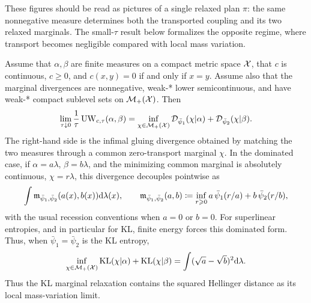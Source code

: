 These figures should be read as pictures of a single relaxed plan $\pi$: the same nonnegative measure determines both the transported coupling and its two relaxed marginals. The small-$\tau$ result below formalizes the opposite regime, where transport becomes negligible compared with local mass variation.

\begin{prop}\label{prop-unbalanced-small-scale-limit}
	Assume that $\alpha,\beta$ are finite measures on a compact metric space $\mathcal{X}$, that $c$ is continuous, $c\geq0$, and $c(x,y)=0$ if and only if $x=y$. Assume also that the marginal divergences are nonnegative, weak-* lower semicontinuous, and have weak-* compact sublevel sets on $\mathcal{M}_+(\mathcal{X})$. Then
	\[
		\lim_{\tau\downarrow0}\frac1\tau\operatorname{UW}_{c,\tau}(\alpha,\beta)
		=
		\inf_{\chi\in\mathcal{M}_+(\mathcal{X})}
		\mathcal{D}_{\bar\psi_1}(\chi|\alpha)
		+
		\mathcal{D}_{\bar\psi_2}(\chi|\beta).
	\]
	The right-hand side is the infimal gluing divergence obtained by matching the two measures through a common zero-transport marginal $\chi$. In the dominated case, if $\alpha=a\lambda$, $\beta=b\lambda$, and the minimizing common marginal is absolutely continuous, $\chi=r\lambda$, this divergence decouples pointwise as
	\[
		\int \mathfrak m_{\bar\psi_1,\bar\psi_2}(a(x),b(x))\mathrm{d}\lambda(x),
		\qquad
		\mathfrak m_{\bar\psi_1,\bar\psi_2}(a,b)
		\coloneqq
		\inf_{r\geqslant0} a\,\bar\psi_1(r/a)+b\,\bar\psi_2(r/b),
	\]
	with the usual recession conventions when $a=0$ or $b=0$. For superlinear entropies, and in particular for KL, finite energy forces this dominated form. Thus, when $\bar\psi_1=\bar\psi_2$ is the KL entropy,
	\[
		\inf_{\chi\in\mathcal{M}_+(\mathcal{X})} \operatorname{KL}(\chi|\alpha)+\operatorname{KL}(\chi|\beta)
		=
		\int (\sqrt{a}-\sqrt{b})^2\mathrm{d}\lambda.
	\]
	Thus the KL marginal relaxation contains the squared Hellinger distance as its local mass-variation limit.
\end{prop}

